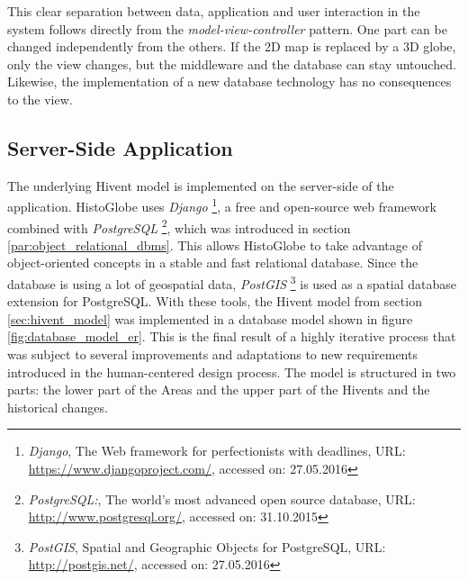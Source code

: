 This clear separation between data, application and user interaction in the system follows directly from the \emph{model-view-controller} pattern. One part can be changed independently from the others. If the 2D map is replaced by a 3D globe, only the view changes, but the middleware and the database can stay untouched. Likewise, the implementation of a new database technology has no consequences to the view.


\subsection{Server-Side Application} %
\label{sub:server_side_application}

The underlying Hivent model is implemented on the server-side of the application. HistoGlobe uses \emph{Django}
\footnote{
  \emph{Django},
  The Web framework for perfectionists with deadlines,
  URL: \url{https://www.djangoproject.com/},
  accessed on: 27.05.2016
},
a free and open-source web framework combined with \emph{PostgreSQL}
\footnote{
  \emph{PostgreSQL:},
  The world's most advanced open source database,
  URL: \url{http://www.postgresql.org/},
  accessed on: 31.10.2015
},
which was introduced in section \ref{par:object_relational_dbms}. This allows HistoGlobe to take advantage of object-oriented concepts in a stable and fast relational database. Since the database is using a lot of geospatial data, \emph{PostGIS}
\footnote{
  \emph{PostGIS},
  Spatial and Geographic Objects for PostgreSQL,
  URL: \url{http://postgis.net/},
  accessed on: 27.05.2016
}
is used as a spatial database extension for PostgreSQL. With these tools, the Hivent model from section \ref{sec:hivent_model}  was implemented in a database model shown in figure \ref{fig:database_model_er}. This is the final result of a highly iterative process that was subject to several improvements and adaptations to new requirements introduced in the human-centered design process. The model is structured in two parts: the lower part of the Areas and the upper part of the Hivents and the historical changes.

